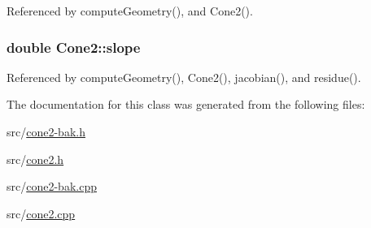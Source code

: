 Referenced by compute\-Geometry(), and Cone2().

\hypertarget{classCone2_a7fbc810b8d75802b56af1acd3e4a39f6}{
\subsubsection[{slope}]{\setlength{\rightskip}{0pt plus 5cm}double Cone2\-::slope\hspace{0.3cm}{\ttfamily [protected]}}}\label{classCone2_a7fbc810b8d75802b56af1acd3e4a39f6}


Referenced by compute\-Geometry(), Cone2(), jacobian(), and residue().



The documentation for this class was generated from the following files\-:\begin{DoxyCompactItemize}
\item 
src/\hyperlink{cone2-bak_8h}{cone2-\/bak.\-h}\item 
src/\hyperlink{cone2_8h}{cone2.\-h}\item 
src/\hyperlink{cone2-bak_8cpp}{cone2-\/bak.\-cpp}\item 
src/\hyperlink{cone2_8cpp}{cone2.\-cpp}\end{DoxyCompactItemize}
